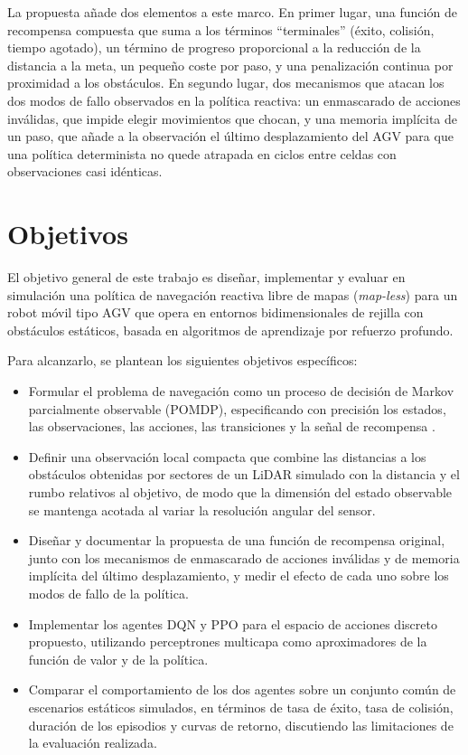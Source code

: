 La propuesta añade dos elementos a este marco. En primer lugar, una
función de recompensa compuesta que suma a los términos ``terminales''
(éxito, colisión, tiempo agotado), un término de progreso proporcional a la
reducción de la distancia a la meta, un pequeño coste por paso, y una
penalización continua por proximidad a los obstáculos. En segundo lugar,
dos mecanismos que atacan los dos modos de fallo observados en la política
reactiva: un enmascarado de acciones inválidas, que impide elegir
movimientos que chocan, y una memoria implícita de un paso, que añade a la
observación el último desplazamiento del AGV para que una política
determinista no quede atrapada en ciclos entre celdas con observaciones
casi idénticas.

\section{Objetivos}\label{sec:objetivos}
El objetivo general de este trabajo es diseñar, implementar y evaluar en
simulación una política de navegación reactiva libre de mapas
(\textit{map-less}) para un robot móvil tipo AGV que opera en entornos
bidimensionales de rejilla con obstáculos estáticos, basada en algoritmos
de aprendizaje por refuerzo profundo.

Para alcanzarlo, se plantean los siguientes objetivos específicos:
\begin{itemize}
    \item Formular el problema de navegación como un proceso de decisión de
    Markov parcialmente observable (POMDP), especificando con precisión los
    estados, las observaciones, las acciones, las transiciones y la señal de
    recompensa \citep{md2024novel,gao2025hierarchical}.
    \item Definir una observación local compacta que combine las distancias
    a los obstáculos obtenidas por sectores de un LiDAR simulado con la
    distancia y el rumbo relativos al objetivo, de modo que la dimensión del
    estado observable se mantenga acotada al variar la resolución angular
    del sensor.
    \item Diseñar y documentar la propuesta de una función de recompensa
    original, junto con los mecanismos de enmascarado de acciones inválidas
    y de memoria implícita del último desplazamiento, y medir el efecto de
    cada uno sobre los modos de fallo de la política.
    \item Implementar los agentes DQN y PPO para el espacio de acciones
    discreto propuesto, utilizando perceptrones multicapa como aproximadores
    de la función de valor y de la política.
    \item Comparar el comportamiento de los dos agentes sobre un conjunto
    común de escenarios estáticos simulados, en términos de tasa de éxito,
    tasa de colisión, duración de los episodios y curvas de retorno,
    discutiendo las limitaciones de la evaluación realizada.
\end{itemize}

